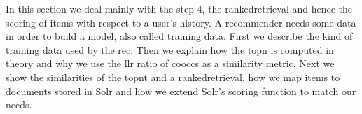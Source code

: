 In this section we deal mainly with the step 4, the \gls{rankedretrieval} and hence the scoring of items with respect to a user's history.
A recommender needs some data in order to build a model, also called training data. 
First we describe the kind of training data used by the \gls{rec}. 
Then we explain how the \gls{topn} is computed in theory and why we use the \gls{llr} ratio of \glspl{coocc} as a similarity metric.
Next we show the similarities of the \gls{topnt} and a \gls{rankedretrieval}, how we map items to documents stored in Solr and how we extend Solr's scoring function to match our needs.






